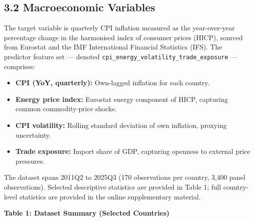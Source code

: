 \documentclass[
  11pt,
  a4paper]{article}
\providecommand{\tightlist}{%
  \setlength{\itemsep}{0pt}\setlength{\parskip}{0pt}}
\begin{document}
\subsection{3.2 Macroeconomic Variables}\label{macroeconomic-variables}

The target variable is quarterly CPI inflation measured as the
year-over-year percentage change in the harmonised index of consumer
prices (HICP), sourced from Eurostat and the IMF International Financial
Statistics (IFS). The predictor feature set --- denoted
\texttt{cpi\_energy\_volatility\_trade\_exposure} --- comprises:

\begin{itemize}
\tightlist
\item
  \textbf{CPI (YoY, quarterly):} Own-lagged inflation for each country.
\item
  \textbf{Energy price index:} Eurostat energy component of HICP,
  capturing common commodity-price shocks.
\item
  \textbf{CPI volatility:} Rolling standard deviation of own inflation,
  proxying uncertainty.
\item
  \textbf{Trade exposure:} Import share of GDP, capturing openness to
  external price pressures.
\end{itemize}

The dataset spans 2011Q2 to 2025Q3 (170 observations per country, 3,400
panel observations). Selected descriptive statistics are provided in
Table 1; full country-level statistics are provided in the online
supplementary material.

\textbf{Table 1: Dataset Summary (Selected Countries)}
\end{document}
